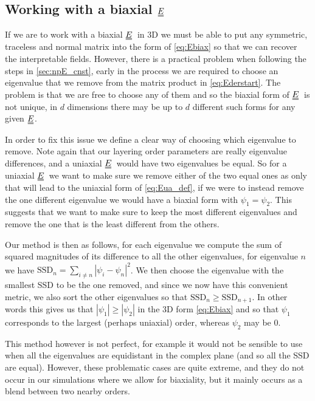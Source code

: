 \documentclass[12pt]{article}
\newcommand{\duf}[2]{\stackunder[0.5pt]{\stackunder[0.8pt]{\stackunder[1pt]{\ensuremath{#1}}{\rule{\widthof{\ensuremath{#2}}*\real{0.9}}{.1ex}}}{\rule{\widthof{\ensuremath{#2}}*\real{0.9}}{.1ex}}}{}}
\newcommand{\du}[1]{\duf{#1}{#1}}
\newcommand{\EE}{\ensuremath{\du{E}}}
\begin{document}
    \subsection{Working with a biaxial \EE}\label{sec:npE_wwbE}
        If we are to work with a biaxial \EE\ in 3D we must be able to put any symmetric, traceless and normal matrix into the form of \cref{eq:Ebiax} so that we can recover the interpretable fields.
        However, there is a practical problem when following the steps in \cref{sec:npE_cnst}, early in the process we are required to choose an eigenvalue that we remove from the matrix product in \cref{eq:Ederstart}.
        The problem is that we are free to choose any of them and so the biaxial form of \EE\ is not unique, in $d$ dimensions there may be up to $d$ different such forms for any given \EE.

        In order to fix this issue we define a clear way of choosing which eigenvalue to remove.
        Note again that our layering order parameters are really eigenvalue differences, and a uniaxial \EE\ would have two eigenvalues be equal.
        So for a uniaxial \EE\ we want to make sure we remove either of the two equal ones as only that will lead to the uniaxial form of \cref{eq:Eua_def}, if we were to instead remove the one different eigenvalue we would have a biaxial form with $\psi_1=\psi_2$.
        This suggests that we want to make sure to keep the most different eigenvalues and remove the one that is the least different from the others.

        Our method is then as follows, for each eigenvalue we compute the sum of squared magnitudes of its difference to all the other eigenvalues, for eigenvalue $n$ we have $\text{SSD}_n = \sum_{i \neq n} |\psi_i-\psi_n|^2$.
        We then choose the eigenvalue with the smallest SSD to be the one removed, and since we now have this convenient metric, we also sort the other eigenvalues so that $\text{SSD}_n \geq \text{SSD}_{n+1}$.
        In other words this gives us that $|\psi_1| \geq |\psi_2|$ in the 3D form \cref{eq:Ebiax} and so that $\psi_1$ corresponds to the largest (perhaps uniaxial) order, whereas $\psi_2$ may be 0.

        This method however is not perfect, for example it would not be sensible to use when all the eigenvalues are equidistant in the complex plane (and so all the SSD are equal).
        However, these problematic cases are quite extreme, and they do not occur in our simulations where we allow for biaxiality, but it mainly occurs as a blend between two nearby orders.
\end{document}
